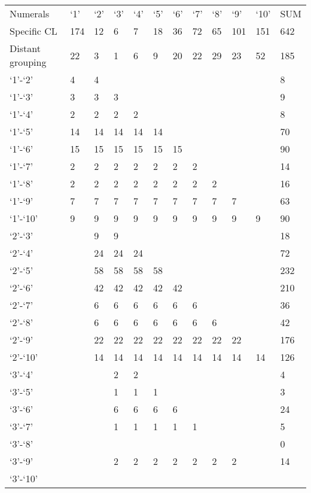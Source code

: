 \begin{table}
\begin{tabularx}{\textwidth}{lXXXXXXXXXXX}
{Numerals} & {‘1’} & {‘2’} & {‘3’} & {‘4’} & {‘5’} & {‘6’} & {‘7’} & {‘8’} & {‘9’} & {‘10’} & {SUM}\\
Specific CL & {\cellcolor{lsLightWine} 174} & 12 & 6 & 7 & 18 & 36 &{\cellcolor{lsLightWine}  72} & {\cellcolor{lsLightWine} 65} & {\cellcolor{lsLightWine} 101} &{\cellcolor{lsLightWine}  151} & 642\\
Distant grouping & 22 & 3 & 1 & 6 & 9 & 20 & 22 & 29 & 23 & 52 & 185\\
\midrule
‘1’-‘2’ & 4 & 4 & & ~ & & ~ & & ~ & & ~ & 8\\
‘1’-‘3’ & 3 & 3 & 3 & & ~ & & ~ & & ~ & & 9\\
‘1’-‘4’ & 2 & 2 & 2 & 2 & & ~ & & ~ & & ~ & 8\\
‘1’-‘5’ & 14 & 14 & 14 & 14 & 14 & & ~ & & ~ & & 70\\
‘1’-‘6’ & 15 & 15 & 15 & 15 & 15 & 15 & & ~ & & ~ & 90\\
‘1’-‘7’ & 2 & 2 & 2 & 2 & 2 & 2 & 2 & & ~ & & 14\\
‘1’-‘8’ & 2 & 2 & 2 & 2 & 2 & 2 & 2 & 2 & & ~ & 16\\
‘1’-‘9’ & 7 & 7 & 7 & 7 & 7 & 7 & 7 & 7 & 7 & & 63\\
‘1’-‘10’ & 9 & 9 & 9 & 9 & 9 & 9 & 9 & 9 & 9 & 9 & 90\\
‘2’-‘3’ & & 9 & 9 & & ~ & & ~ & & ~ & & 18\\
‘2’-‘4’ & & 24 & 24 & 24 & & ~ & & ~ & & ~ & 72\\
‘2’-‘5’ & & \cellcolor{lsLightWine} 58 &\cellcolor{lsLightWine}  58 &\cellcolor{lsLightWine}  58 &\cellcolor{lsLightWine}  58 & & ~ & & ~ & & 232\\
‘2’-‘6’ & & \cellcolor{lsLightWine} 42 & \cellcolor{lsLightWine} 42 &\cellcolor{lsLightWine}  42 & \cellcolor{lsLightWine} 42 &\cellcolor{lsLightWine}  42 & & ~ & & ~ & 210\\
‘2’-‘7’ & & 6 & 6 & 6 & 6 & 6 & 6 & & ~ & & 36\\
‘2’-‘8’ & & 6 & 6 & 6 & 6 & 6 & 6 & 6 & & ~ & 42\\
‘2’-‘9’ & & 22 & 22 & 22 & 22 & 22 & 22 & 22 & 22 & & 176\\
‘2’-‘10’ & & 14 & 14 & 14 & 14 & 14 & 14 & 14 & 14 & 14 & 126\\
‘3’-‘4’ & & ~ & 2 & 2 & & ~ & & ~ & & ~ & 4\\
‘3’-‘5’ & & ~ & 1 & 1 & 1 & & ~ & & ~ & & 3\\
‘3’-‘6’ & & ~ & 6 & 6 & 6 & 6 & & ~ & & ~ & 24\\
‘3’-‘7’ & & ~ & 1 & 1 & 1 & 1 & 1 & & ~ & & 5\\
‘3’-‘8’ & & ~ & & ~ & & ~ & & ~ & & ~ & 0\\
‘3’-‘9’ & & ~ & 2 & 2 & 2 & 2 & 2 & 2 & 2 & & 14\\
‘3’-‘10’ & & ~ & & ~ & & ~ & & ~ & & ~ & ~\\
\midrule
\end{tabularx}
\end{table}
